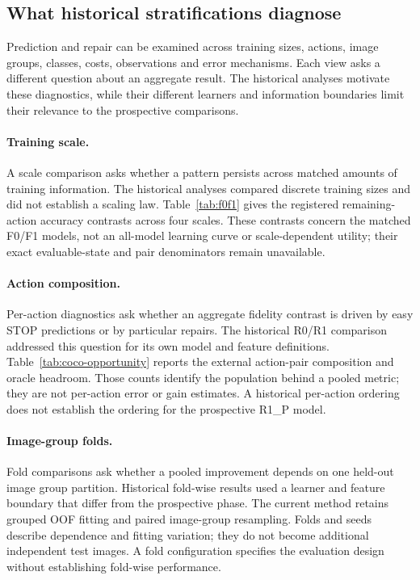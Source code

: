\subsection{What historical stratifications diagnose}
\label{sec:historical-diagnostic-dimensions}
Prediction and repair can be examined across training sizes, actions, image
groups, classes, costs, observations and error mechanisms. Each view asks
a different question about an aggregate result. The historical analyses
motivate these diagnostics, while their different learners and information
boundaries limit their relevance to the prospective comparisons.

\paragraph{Training scale.}
A scale comparison asks whether a pattern persists across matched amounts
of training information. The historical analyses compared discrete
training sizes and did not establish a scaling law.
Table~\ref{tab:f0f1} gives the registered remaining-action accuracy
contrasts across four scales. These contrasts concern the matched F0/F1
models, not an all-model learning curve or scale-dependent utility; their
exact evaluable-state and pair denominators remain unavailable.

\paragraph{Action composition.}
Per-action diagnostics ask whether an aggregate fidelity contrast is driven
by easy STOP predictions or by particular repairs. The historical R0/R1
comparison addressed this question for its own model and feature definitions.
Table~\ref{tab:coco-opportunity} reports the external
action-pair composition and oracle headroom. Those counts identify the
population behind a pooled metric; they are not per-action error or gain
estimates. A historical per-action ordering does not establish the ordering
for the prospective R1\_P model.

\paragraph{Image-group folds.}
Fold comparisons ask whether a pooled improvement depends on one held-out
image group partition. Historical fold-wise results used a learner and
feature boundary that differ from the prospective phase.
The current method retains grouped OOF fitting and paired image-group
resampling. Folds and seeds describe dependence and fitting variation;
they do not become additional independent test images. A fold configuration
specifies the evaluation design without establishing fold-wise performance.

